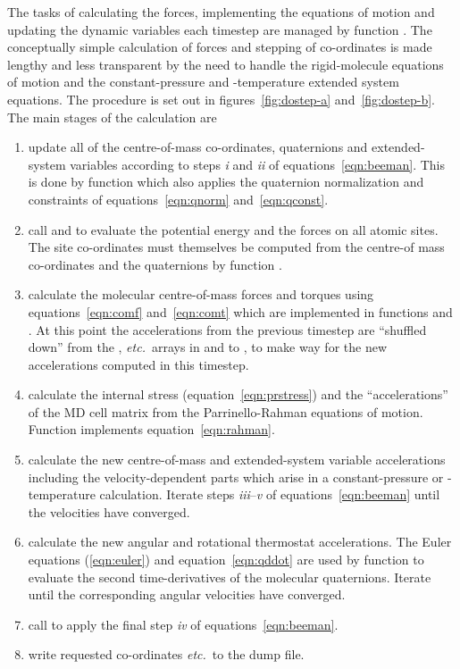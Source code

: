 \documentclass[a4paper,twoside]{report}
\newcommand{\etc}{\emph{etc.}}
\begin{document}
The tasks of calculating the forces, implementing the equations of
motion and updating the dynamic variables each timestep are managed by
function .  The conceptually simple calculation of
forces and stepping of co-ordinates is made lengthy and less
transparent by the need to handle the rigid-molecule equations of
motion and the constant-pressure and -temperature extended system
equations.  The procedure is set out in figures~\ref{fig:dostep-a}
and~\ref{fig:dostep-b}.  The main stages of the calculation are
\begin{enumerate}
\renewcommand{\theenumi}{\emph{\alph{enumi}}}
\item update all of the centre-of-mass co-ordinates, quaternions and
  extended-system variables according to steps \emph{i} and
  \emph{ii} of equations~\ref{eqn:beeman}. This is done by function
   which also applies the quaternion normalization
  and constraints of equations~\ref{eqn:qnorm} and~\ref{eqn:qconst}.
\item call  and  to
  evaluate the potential energy and the forces on all atomic sites.
  The site co-ordinates must themselves be computed from the centre-of
  mass co-ordinates and the quaternions by function
  . 
\item calculate the molecular centre-of-mass forces and torques using
  equations~\ref{eqn:comf} and~\ref{eqn:comt}  which are implemented
  in functions  and . At
  this point the accelerations from the previous timestep are
  ``shuffled down'' from the ,  \etc\ arrays
  in  and  to ,
   to make way for the new accelerations computed in
  this timestep. 
\item calculate the internal stress (equation~\ref{eqn:prstress}) and
  the ``accelerations'' of the MD cell matrix from the
  Parrinello-Rahman equations of motion. Function 
  implements equation~\ref{eqn:rahman}.
\item calculate the new centre-of-mass and extended-system
  variable accelerations including the velocity-dep\-end\-ent parts
  which arise in a constant-pressure or -temperature calculation.
  Iterate steps \emph{iii}--\emph{v} of equations~\ref{eqn:beeman}
  until the velocities have converged. \label{loop:vel}
\item calculate the new angular and rotational thermostat
  accelerations. The Euler equations (\ref{eqn:euler}) and
  equation~\ref{eqn:qddot} are used by function  to
  evaluate the second time-derivatives of the molecular quaternions.
  Iterate until the corresponding angular velocities have
  converged. \label{loop:quat} 
\item call  to apply the final step \emph{iv} of
  equations~\ref{eqn:beeman}.
\item write requested co-ordinates \etc\ to the dump file.
\end{enumerate}
\end{document}
